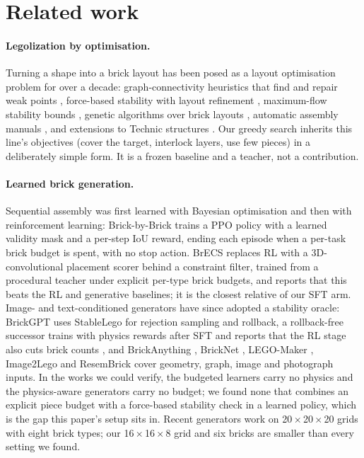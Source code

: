 \section{Related work}
\label{sec:related}

\paragraph{Legolization by optimisation.} Turning a shape into a brick layout has been posed as a layout
optimisation problem for over a decade: graph-connectivity heuristics that find and repair weak points
\citep{testuz2013constructable}, force-based stability with layout refinement \citep{luo2015legolization},
maximum-flow stability bounds \citep{wassmann2012maxflow}, genetic algorithms over brick layouts
\citep{lee2015galayout,lee2018smga}, automatic assembly manuals \citep{ono2013legobuilder}, and extensions to
Technic structures \citep{xu2019technic}. Our greedy search inherits this line's objectives (cover the target,
interlock layers, use few pieces) in a deliberately simple form. It is a frozen baseline and a teacher, not a
contribution.

\paragraph{Learned brick generation.} Sequential assembly was first learned with Bayesian optimisation
\citep{kim2020combinatorial} and then with reinforcement learning: Brick-by-Brick \citep{chung2021brickbybrick}
trains a PPO policy with a learned validity mask and a per-step IoU reward, ending each episode when a per-task
brick budget is spent, with no stop action. BrECS \citep{ahn2024brecs} replaces RL with a 3D-convolutional
placement scorer behind a constraint filter, trained from a procedural teacher under explicit per-type brick
budgets, and reports that this beats the RL and generative baselines; it is the closest relative of our SFT arm.
Image- and text-conditioned generators have since adopted a stability oracle: BrickGPT \citep{pun2025brickgpt}
uses StableLego for rejection sampling and rollback, a rollback-free successor trains with physics rewards after
SFT and reports that the RL stage also cuts brick counts \citep{xu2026stable}, and BrickAnything
\citep{ni2026brickanything}, BrickNet \citep{kulits2026bricknet}, LEGO-Maker \citep{ge2025legomaker},
Image2Lego \citep{lennon2021image2lego} and ResemBrick \citep{chen2026resembrick} cover geometry, graph, image and
photograph inputs. In the works we could verify, the budgeted learners carry no physics and the physics-aware
generators carry no budget; we found none that combines an explicit piece budget with a force-based stability
check in a learned policy, which is the gap this paper's setup sits in. Recent generators work on
20\,$\times$\,20\,$\times$\,20 grids with eight brick types; our 16\,$\times$\,16\,$\times$\,8 grid and six bricks
are smaller than every setting we found.

